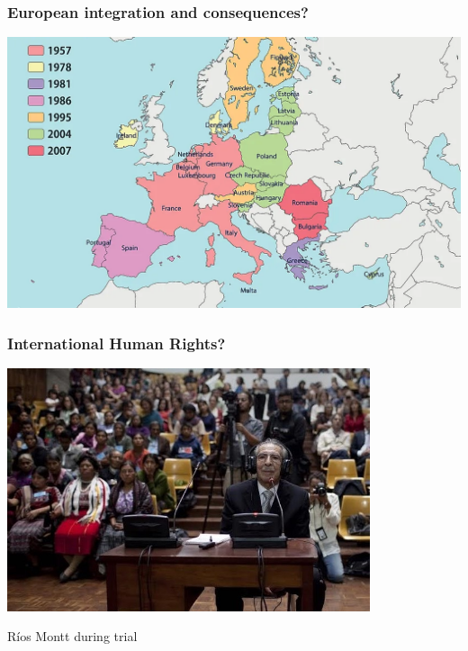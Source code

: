 \documentclass[aspectratio=43]{beamer}
\begin{document}
\begin{frame}
\frametitle{European integration and consequences?}
\centering

\includegraphics[width = \textwidth]{img/EU}

\end{frame}

\begin{frame}
\frametitle{International Human Rights?}
\centering

\includegraphics[width = 0.8\textwidth]{img/riosmontt}

{\small Ríos Montt during trial}

\end{frame}
\end{document}
